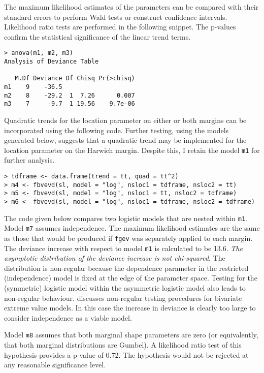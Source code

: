 \documentclass[11pt,a4paper]{article}
\begin{document}
The maximum likelihood estimates of the parameters can be compared with their standard errors to perform Wald tests or construct confidence intervals.
Likelihood ratio tests are performed in the following snippet. 
The p-values confirm the statistical significance of the linear trend terms.

\begin{verbatim}
> anova(m1, m2, m3)
Analysis of Deviance Table

   M.Df Deviance Df Chisq Pr(>chisq)
m1    9    -36.5
m2    8    -29.2  1  7.26      0.007 
m3    7     -9.7  1 19.56    9.7e-06 
\end{verbatim}

Quadratic trends for the location parameter on either or both margins can be incorporated using the following code.
Further testing, using the models generated below, suggests that a quadratic trend may be implemented for the location parameter on the Harwich margin.
Despite this, I retain the model \verb+m1+ for further analysis. 

\begin{verbatim}
> tdframe <- data.frame(trend = tt, quad = tt^2)
> m4 <- fbvevd(sl, model = "log", nsloc1 = tdframe, nsloc2 = tt)
> m5 <- fbvevd(sl, model = "log", nsloc1 = tt, nsloc2 = tdframe)
> m6 <- fbvevd(sl, model = "log", nsloc1 = tdframe, nsloc2 = tdframe)
\end{verbatim}

The code given below compares two logistic models that are nested within \verb+m1+. Model \verb+m7+ assumes independence.
The maximum likelihood estimates are the same as those that would be produced if \verb+fgev+ was separately applied to each margin.
The deviance increase with respect to model \verb+m1+ is calculated to be 13.6.
\emph{The asymptotic distribution of the deviance increase is not chi-squared}.
The distribution is non-regular because the dependence parameter in the restricted (independence) model is fixed at the edge of the parameter space.
Testing for the (symmetric) logistic model within the asymmetric logistic model also leads to non-regular behaviour.
\cite{tawn88} discusses non-regular testing procedures for bivariate extreme value models.
In this case the increase in deviance is clearly too large to consider independence as a viable model.

Model \verb+m8+ assumes that both marginal shape parameters are zero (or equivalently, that both marginal distributions are Gumbel).
A likelihood ratio test of this hypothesis provides a p-value of $0.72$.
The hypothesis would not be rejected at any reasonable significance level.   
\end{document}
